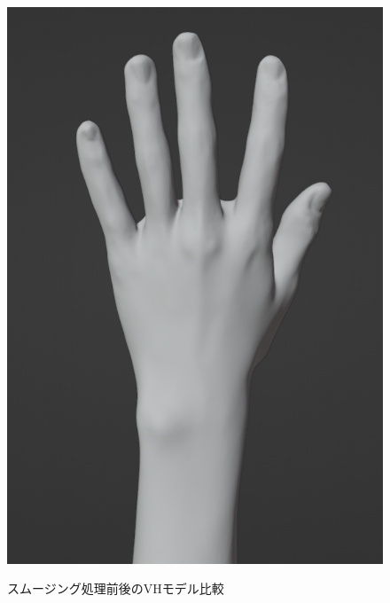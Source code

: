 \documentclass{ltjsreport}
\begin{document}
\begin{figure}[H]
		\hspace{0.04\columnwidth}
		\begin{minipage}{0.32\columnwidth}
		\centering
		\includegraphics[width = \columnwidth]{../figs/SmoothingAfterRear.png}
		\label{fig:smoothingafter}
		\end{minipage}
		\caption{スムージング処理前後のVHモデル比較}
		\label{fig:smoothing}
		\end{figure}
		\vspace{-15pt}
\end{document}
